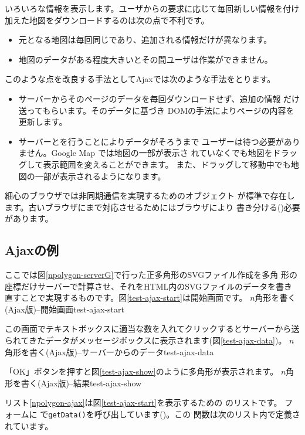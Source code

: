 いろいろな情報を表示します。ユーザからの要求に応じて毎回新しい情報を付け
加えた地図をダウンロードするのは次の点で不利です。
\begin{itemize}
 \item 元となる地図は毎回同じであり、追加される情報だけが異なります。
 \item 地図のデータがある程度大きいとその間ユーザは作業ができません。
\end{itemize}
このような点を改良する手法としてAjaxでは次のような手法をとります。
\begin{itemize}
 \item サーバーからそのページのデータを毎回ダウンロードせず、追加の情報
       だけ送ってもらいます。そのデータに基づき
       DOMの手法によりページの内容を更新します。
 \item サーバーとを行うことによりデータがそろうまで
       ユーザーは待つ必要がありません。Google Map では地図の一部が表示さ
       れていなくでも地図をドラッグして表示範囲を変えることができます。
       また、ドラッグして移動中でも地図の一部が表示されるようになります。
\end{itemize}
細心のブラウザでは非同期通信を実現するためのオブジェクト
が標準で存在します。古いブラウザにまで対応させるためにはブラウザにより
書き分ける()必要があります。

\subsection{Ajaxの例}\label{AjaxEx}
ここでは図\ref{npolygon-serverG}で行った正多角形のSVGファイル作成を多角
形の座標だけサーバーで計算させ、それをHTML内のSVGファイルのデータを書き
直すことで実現するものです。図\ref{test-ajax-start}は開始画面です。
{$n$角形を書く(Ajax版)--開始画面}{test-ajax-start}

この画面でテキストボックスに適当な数を入れてクリックするとサーバーから送
られてきたデータがメッセージボックスに表示されます(図\ref{test-ajax-data})。
{$n$角形を書く(Ajax版)--サーバーからのデータ}{test-ajax-data}


「OK」ボタンを押すと図\ref{test-ajax-show}のように多角形が表示されます。
{$n$角形を書く(Ajax版)--結果}{test-ajax-show}
%
\newpage

リスト\ref{npolygon-ajax}は図\ref{test-ajax-start}を表示するための\HTML
のリストです。
フォームに
       で\texttt{getData()}を呼び出しています()。この
       関数は次のリスト内で定義されています。

